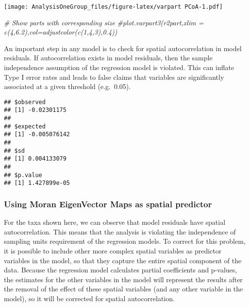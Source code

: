 \documentclass[]{article}
\newenvironment{Shaded}{\begin{snugshade}}{\end{snugshade}}
\newcommand{\CommentTok}[1]{\textcolor[rgb]{0.56,0.35,0.01}{\textit{#1}}}
\newcommand{\KeywordTok}[1]{\textcolor[rgb]{0.13,0.29,0.53}{\textbf{#1}}}
\newcommand{\NormalTok}[1]{#1}
\newcommand{\OperatorTok}[1]{\textcolor[rgb]{0.81,0.36,0.00}{\textbf{#1}}}
\begin{document}
\texttt{[image: AnalysisOneGroup\_files/figure-latex/varpart PCoA-1.pdf]}

\begin{Shaded}
\begin{Highlighting}[]
\CommentTok{# Show parts with corresponding size}
\CommentTok{#plot.varpart3(r2part,xlim = c(4,6.2),col=adjustcolor(c(1,4,3),0.4))}
\end{Highlighting}
\end{Shaded}

An important step in any model is to check for spatial autocorrelation
in model residuals. If autocorrelation exists in model residuals, then
the sample independence assumption of the regression model is violated.
This can inflate Type I error rates and leads to false claims that
variables are significantly associated at a given threshold (e.g.~0.05).

\begin{Shaded}
\end{Shaded}

\begin{verbatim}
## $observed
## [1] -0.02301175
## 
## $expected
## [1] -0.005076142
## 
## $sd
## [1] 0.004133079
## 
## $p.value
## [1] 1.427899e-05
\end{verbatim}

\hypertarget{using-moran-eigenvector-maps-as-spatial-predictor}{%
\subsubsection{Using Moran EigenVector Maps as spatial
predictor}\label{using-moran-eigenvector-maps-as-spatial-predictor}}

For the taxa shown here, we can observe that model residuals have
spatial autocorrelation. This means that the analysis is violating the
independence of sampling units requirement of the regression models. To
correct for this problem, it is possible to include other more complex
spatial variables as predictor variables in the model, so that they
capture the entire spatial component of the data. Because the regression
model calculates partial coefficients and p-values, the estimates for
the other variables in the model will represent the results after the
removal of the effect of these spatial variables (and any other variable
in the model), so it will be corrected for spatial autocorrelation.
\end{document}
